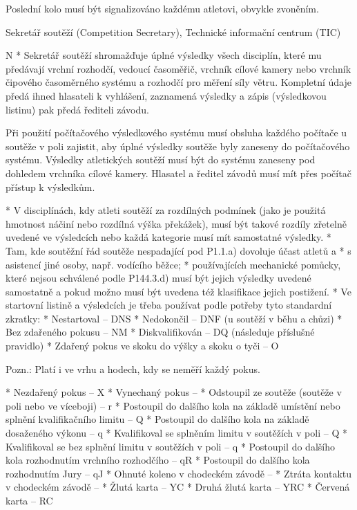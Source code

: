 Poslední kolo musí být signalizováno každému atletovi, obvykle zvoněním.
\enditems

\secc Sekretář soutěží (Competition Secretary), Technické informační centrum (TIC)

\begitems \style N
* Sekretář soutěží shromažďuje úplné výsledky všech disciplín, které mu předávají vrchní rozhodčí, vedoucí časoměřič, vrchník cílové kamery nebo vrchník čipového časoměrného systému a rozhodčí pro měření síly větru. Kompletní údaje předá ihned hlasateli k vyhlášení, zaznamená výsledky a zápis (výsledkovou listinu) pak předá řediteli závodu.

Při použití počítačového výsledkového systému musí obsluha každého počítače u soutěže v poli zajistit, aby úplné výsledky soutěže byly zaneseny do počítačového systému. Výsledky atletických soutěží musí být do systému zaneseny pod dohledem vrchníka cílové kamery. Hlasatel a ředitel závodů musí mít přes počítač přístup k výsledkům.

* V disciplínách, kdy atleti soutěží za rozdílných podmínek (jako je použitá hmotnost náčiní nebo rozdílná výška překážek), musí být takové rozdíly zřetelně uvedené ve výsledcích nebo každá kategorie musí mít samostatné výsledky.
* Tam, kde soutěžní řád soutěže nespadající pod P1.1.a) dovoluje účast atletů
  \begitems \style a
  * s asistencí jiné osoby, např. vodícího běžce;
  * používajících mechanické pomůcky, které nejsou schválené podle P144.3.d) musí být jejich výsledky uvedené samostatně a pokud možno musí být uvedena též klasifikace jejich postižení.
  \enditems
* Ve startovní listině a výsledcích je třeba používat podle potřeby tyto standardní zkratky:
  \begitems
  * Nestartoval -- DNS
  * Nedokončil -- DNF (u soutěží v běhu a chůzi)
  * Bez zdařeného pokusu -- NM
  * Diskvalifikován -- DQ (následuje příslušné pravidlo)
  * Zdařený pokus ve skoku do výšky a skoku o tyči -- O

  Pozn.: Platí i ve vrhu a hodech, kdy se neměří každý pokus.

  * Nezdařený pokus -- X
  * Vynechaný pokus -- \uv{-}
  * Odstoupil ze soutěže (soutěže v poli nebo ve víceboji) -- r
  * Postoupil do dalšího kola na základě umístění nebo splnění kvalifikačního limitu -- Q
  * Postoupil do dalšího kola na základě dosaženého výkonu -- q
  * Kvalifikoval se  splněním limitu v soutěžích v poli -- Q
  * Kvalifikoval se bez splnění limitu v soutěžích v poli -- q
  * Postoupil do dalšího kola rozhodnutím vrchního rozhodčího -- qR
  * Postoupil do dalšího kola rozhodnutím Jury -- qJ
  * Ohnuté koleno v chodeckém závodě -- \uv{$>$}
  * Ztráta kontaktu v chodeckém závodě -- \uv{$~$}
  * Žlutá karta -- YC
  * Druhá žlutá karta -- YRC
  * Červená karta -- RC
  \enditems

